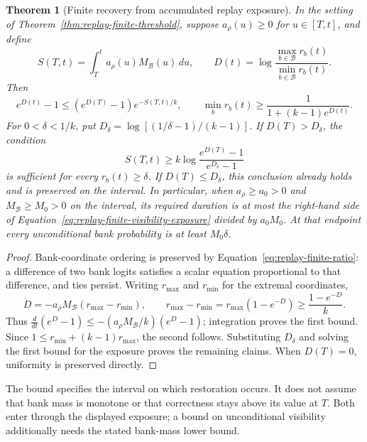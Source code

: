 \documentclass{article}
\newcommand{\enforcehalffinalproseline}{%
  \setlength{\parfillskip}{0pt plus .20\linewidth}}
\newcommand{\1}{\mathbf 1}
\newtheorem{theorem}[lemma]{Theorem}
\theoremstyle{remark}
\theoremstyle{definition}
\theoremstyle{plain}
\begin{document}
\begin{theorem}[Finite recovery from accumulated replay exposure]
\enforcehalffinalproseline
\label{thm:replay-finite-recovery}
In the setting of Theorem~\ref{thm:replay-finite-threshold}, suppose
$a_\rho(u)\ge0$ for $u\in[T,t]$, and define
\[
 S(T,t)=\int_T^t a_\rho(u)M_{\mathcal B}(u)\,du,
 \qquad D(t)=\log\frac{\max_{b\in\mathcal B}r_b(t)}
                            {\min_{b\in\mathcal B}r_b(t)}.
\]
Then
\begin{equation}
 e^{D(t)}-1\le(e^{D(T)}-1)e^{-S(T,t)/k},
 \qquad
 \min_b r_b(t)\ge\frac{1}{1+(k-1)e^{D(t)}}.
 \label{eq:replay-finite-recovery}
\end{equation}
For $0<\delta<1/k$, put
$D_\delta=\log[(1/\delta-1)/(k-1)]$. If $D(T)>D_\delta$, the condition
\begin{equation}
 S(T,t)\ge k\log\frac{e^{D(T)}-1}{e^{D_\delta}-1}
 \label{eq:replay-finite-visibility-exposure}
\end{equation}
is sufficient for every $r_b(t)\ge\delta$. If $D(T)\le D_\delta$, this
conclusion already holds and is preserved on the interval. In particular,
when $a_\rho\ge a_0>0$ and $M_{\mathcal B}\ge M_0>0$ on the interval,
its required duration is at most the right-hand side of
Equation~\eqref{eq:replay-finite-visibility-exposure} divided by $a_0M_0$.
At that endpoint every unconditional bank probability is at least
$M_0\delta$.
\end{theorem}

\begin{proof}
\enforcehalffinalproseline
Bank-coordinate ordering is preserved by
Equation~\eqref{eq:replay-finite-ratio}: a difference of two bank logits
satisfies a scalar equation proportional to that difference, and ties persist.
Writing $r_{\max}$ and $r_{\min}$ for the extremal coordinates,
\[
 \dot D=-a_\rho M_{\mathcal B}(r_{\max}-r_{\min}),
 \qquad
 r_{\max}-r_{\min}
   =r_{\max}(1-e^{-D})\ge\frac{1-e^{-D}}{k}.
\]
Thus $\frac{d}{dt}(e^D-1)\le
 -(a_\rho M_{\mathcal B}/k)(e^D-1)$; integration proves the first bound.
Since $1\le r_{\min}+(k-1)r_{\max}$, the second follows. Substituting
$D_\delta$ and solving the first bound for the exposure proves the remaining
claims. When $D(T)=0$, uniformity is preserved directly.
\end{proof}

The bound specifies the interval on which restoration occurs. It does not
assume that bank mass is monotone or that correctness stays above its value
at $T$. Both enter through the displayed exposure; a bound on unconditional
visibility additionally needs the stated bank-mass lower bound.
\end{document}
